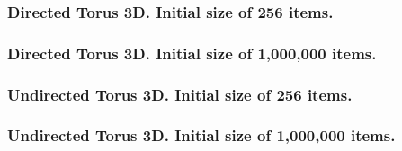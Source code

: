\clearpage
\subsubsection{Directed Torus 3D. Initial size of 256 items.}



\clearpage
\subsubsection{Directed Torus 3D. Initial size of  1,000,000 items.}



\clearpage
\subsubsection{Undirected Torus 3D. Initial size of 256 items.}



\clearpage
\subsubsection{Undirected Torus 3D. Initial size of  1,000,000 items.}




